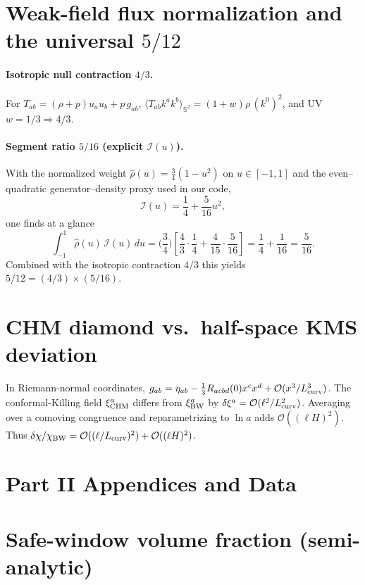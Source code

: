 \documentclass[aps,prd,onecolumn,superscriptaddress,nofootinbib]{revtex4-2}
\begin{document}
\section{Weak-field flux normalization and the universal \texorpdfstring{$5/12$}{5/12}}
\label{app:five-twelve}
\paragraph{Isotropic null contraction \(4/3\).} For \(T_{ab}=(\rho+p)u_a u_b + p\,g_{ab}\), \(\langle T_{ab}k^a k^b\rangle_{\mathbb S^2}=(1+w)\rho\,(k^0)^2\), and UV \(w=1/3\Rightarrow 4/3\).

\paragraph{Segment ratio \(5/16\) (explicit \(\mathcal I(u)\)).}
With the normalized weight \(\hat\rho(u)=\tfrac{3}{4}(1-u^2)\) on \(u\in[-1,1]\) and the even–quadratic generator–density proxy used in our code,
\[
\mathcal I(u)=\frac{1}{4}+\frac{5}{16}u^2,
\]
one finds at a glance
\[
\int_{-1}^{1}\! \hat\rho(u)\,\mathcal I(u)\,du
=\Big(\frac{3}{4}\Big)\!\left[\frac{4}{3}\cdot\frac{1}{4}+\frac{4}{15}\cdot\frac{5}{16}\right]
=\frac{1}{4}+\frac{1}{16}
=\frac{5}{16}.
\]
Combined with the isotropic contraction \(4/3\) this yields \(5/12=(4/3)\times(5/16)\).

\section{CHM diamond vs.\ half-space KMS deviation}
\label{app:chm-kms-estimate}
In Riemann-normal coordinates,
\(g_{ab}=\eta_{ab}-\tfrac{1}{3}R_{acbd}(0)x^c x^d+\mathcal O(x^3/L_{\rm curv}^3)\).
The conformal-Killing field \(\xi^a_{\rm CHM}\) differs from \(\xi^a_{\rm BW}\) by \(\delta\xi^a=\mathcal O(\ell^2/L_{\rm curv}^2)\).
Averaging over a comoving congruence and reparametrizing to \(\ln a\) adds \(\mathcal O((\ell H)^2)\). Thus
\(\delta\chi/\chi_{\rm BW}=\mathcal O((\ell/L_{\rm curv})^2)+\mathcal O((\ell H)^2)\).

\section*{Part II Appendices and Data}

\section{Safe-window volume fraction (semi-analytic)}
\label{app:fv}
\end{document}
